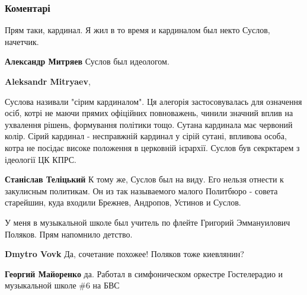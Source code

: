  
 
 
 
 
\subsubsection{Коментарі}

\begin{itemize} %
Прям таки, кардинал. Я жил в то время и кардиналом был некто Суслов, начетчик.

\begin{itemize} %
\textbf{Александр Митряев} Суслов был идеологом.

\textbf{Aleksandr Mitryaev}, 

Суслова називали "сірим кардиналом". Ця алегорія застосовувалась для означення
осіб, котрі не маючи прямих офіційних повноважень, чинили значний вплив на
ухвалення рішень, формування політики тощо. Сутана кардинала має червоний
колір. Сірий кардинал - несправжній кардинал у сірій сутані, впливова особа,
котра не посідає високе положення в церковній ієрархії. Суслов був секрктарем з
ідеології ЦК КПРС.

\begin{itemize} %
\textbf{Станіслав Теліцький} К тому же, Суслов был на виду. Его нельзя отнести к закулисным политикам. Он из так называемого малого Политбюро - совета старейшин, куда входили Брежнев, Андропов, Устинов и Суслов.
\end{itemize} %

\end{itemize} %


У меня в музыкальной школе был учитель по флейте Григорий Эммануилович Поляков.
Прям напомнило детство.

\begin{itemize} %
\textbf{Dmytro Vovk} Да, сочетание похожее! Поляков тоже киевлянин?

\begin{itemize} %
\textbf{Георгий Майоренко} да. Работал в симфоническом оркестре Гостелерадио и музыкальной школе \#6 на БВС


\end{itemize}
\end{itemize}
\end{itemize}
